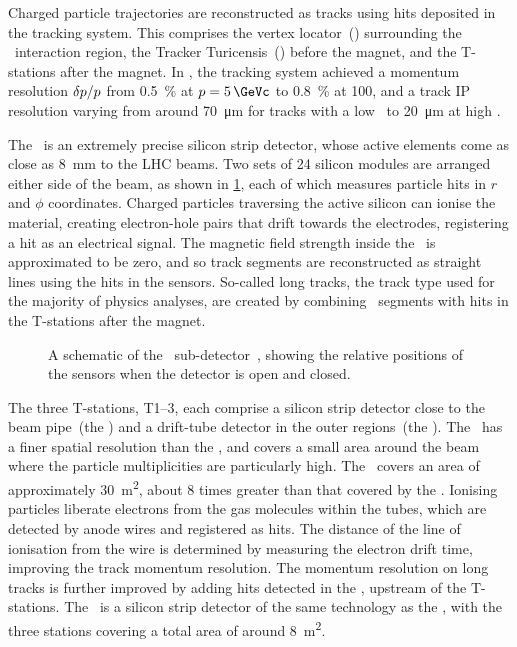 Charged particle trajectories are reconstructed as tracks using hits deposited 
in the tracking system.
This comprises the vertex locator~(\velo) surrounding the \pp\ interaction 
region, the Tracker Turicensis~(\ttracker) before the magnet, and the 
T-stations after the magnet.
In \runone, the tracking system achieved a momentum resolution 
$\delta{\ensuremath{p}}/p$ from \SI{0.5}{\percent} at $\ptot = \SI{5}{\GeVc}$ to 
\SI{0.8}{\percent} at \SI{100}{\GeVc}, and a track \acl{IP} resolution varying 
from around \SI{70}{\micro\metre} for tracks with a low \pT\ to 
\SI{20}{\micro\metre} at high \pT.

The \velo\ is an extremely precise silicon strip detector, whose active 
elements come as close as \SI{8}{\milli\metre} to the \ac{LHC} beams.
Two sets of 24 silicon modules are arranged either side of the beam, as shown 
in \cref{fig:intro:lhcb:velo}, each of which measures particle hits in $r$ and 
$\phi$ coordinates.
Charged particles traversing the active silicon can ionise the material, 
creating electron-hole pairs that drift towards the electrodes, registering a 
hit as an electrical signal.
The magnetic field strength inside the \velo\ is approximated to be zero, and 
so track segments are reconstructed as straight lines using the hits in the 
sensors.
So-called long tracks, the track type used for the majority of physics 
analyses, are created by combining \velo\ segments with hits in the T-stations 
after the magnet.

\begin{figure}
  \centering
  
  \caption{%
    A schematic of the \velo\ sub-detector~\cite{Alves:2008zz}, showing the
    relative positions of the sensors when the detector is open and closed.
  }
  \label{fig:intro:lhcb:velo}
\end{figure}

The three T-stations, T1--3, each comprise a silicon strip detector close to 
the beam pipe~(the \itracker) and a drift-tube detector in the outer 
regions~(the \otracker).
The \itracker\ has a finer spatial resolution than the \otracker, and covers a 
small area around the beam where the particle multiplicities are particularly 
high.
The \otracker\ covers an area of approximately \SI{30}{\metre\squared}, about 8 
times greater than that covered by the \itracker.
Ionising particles liberate electrons from the gas molecules within the tubes, 
which are detected by anode wires and registered as hits.
The distance of the line of ionisation from the wire is determined by measuring 
the electron drift time, improving the track momentum resolution.
The momentum resolution on long tracks is further improved by adding hits 
detected in the \ttracker, upstream of the T-stations.
The \ttracker\ is a silicon strip detector of the same technology as the 
\itracker, with the three stations covering a total area of around 
\SI{8}{\metre\squared}.

